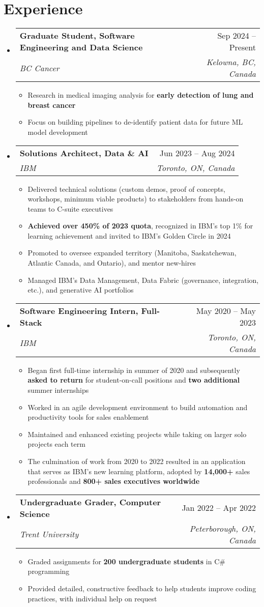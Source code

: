 \documentclass[letterpaper,11.5pt]{article}
\makeatletter
\newcommand{\resumeItem}[1]{
  \item\small{
    {#1 \vspace{-2pt}}
  }
}
\newcommand{\resumeSubheading}[4]{
  \vspace{-2pt}\item
    \begin{tabular*}{0.97\textwidth}[t]{l@{\extracolsep{\fill}}r}
      \textbf{#1} & #2 \\
      \textit{\small#3} & \textit{\small #4} \\
    \end{tabular*}\vspace{-7pt}
}
\newcommand{\resumeSubHeadingListStart}{\begin{itemize}[leftmargin=0.15in, label={}]}
\newcommand{\resumeSubHeadingListEnd}{\end{itemize}}
\newcommand{\resumeItemListStart}{\begin{itemize}}
\newcommand{\resumeItemListEnd}{\end{itemize}\vspace{-5pt}}
\makeatother
\begin{document}
\section{Experience}
  \resumeSubHeadingListStart
    \resumeSubheading
      {Graduate Student, Software Engineering and Data Science}{Sep 2024 -- Present}
      {BC Cancer}{Kelowna, BC, Canada}
      \resumeItemListStart
        \resumeItem{Research in medical imaging analysis for \textbf{early detection of lung and breast cancer}}
        \resumeItem{Focus on building pipelines to de-identify patient data for future ML model development}
      \resumeItemListEnd
    \resumeSubheading
      {Solutions Architect, Data \& AI}{Jun 2023 -- Aug 2024}
      {IBM}{Toronto, ON, Canada}
      \resumeItemListStart
        \resumeItem{Delivered technical solutions (custom demos, proof of concepts, workshops, minimum viable products) to stakeholders from hands-on teams to C-suite executives}
        \resumeItem{\textbf{Achieved over 450\% of 2023 quota}, recognized in IBM's top 1\% for learning achievement and invited to IBM's Golden Circle in 2024}
        \resumeItem{Promoted to oversee expanded territory (Manitoba, Saskatchewan, Atlantic Canada, and Ontario), and mentor new-hires}
        \resumeItem{Managed IBM's Data Management, Data Fabric (governance, integration, etc.), and generative AI portfolios}
      \resumeItemListEnd
    \resumeSubheading
      {Software Engineering Intern, Full-Stack}{May 2020 -- May 2023}
      {IBM}{Toronto, ON, Canada}
      \resumeItemListStart
        \resumeItem{Began first full-time internship in summer of 2020 and subsequently \textbf{asked to return} for student-on-call positions and \textbf{two additional} summer internships}
        \resumeItem{Worked in an agile development environment to build automation and productivity tools for sales enablement}
        \resumeItem{Maintained and enhanced existing projects while taking on larger solo projects each term}
        \resumeItem{The culmination of work from 2020 to 2022 resulted in an application that serves as IBM's new learning platform, adopted by \textbf{14,000+} sales professionals and \textbf{800+ sales executives worldwide}}
      \resumeItemListEnd
      \resumeSubheading
      {Undergraduate Grader, Computer Science}{Jan 2022 -- Apr 2022}
      {Trent University}{Peterborough, ON, Canada}
      \resumeItemListStart
        \resumeItem{Graded assignments for \textbf{200 undergraduate students} in C\# programming}
        \resumeItem{Provided detailed, constructive feedback to help students improve coding practices, with individual help on request}
      \resumeItemListEnd
  \resumeSubHeadingListEnd
\end{document}
